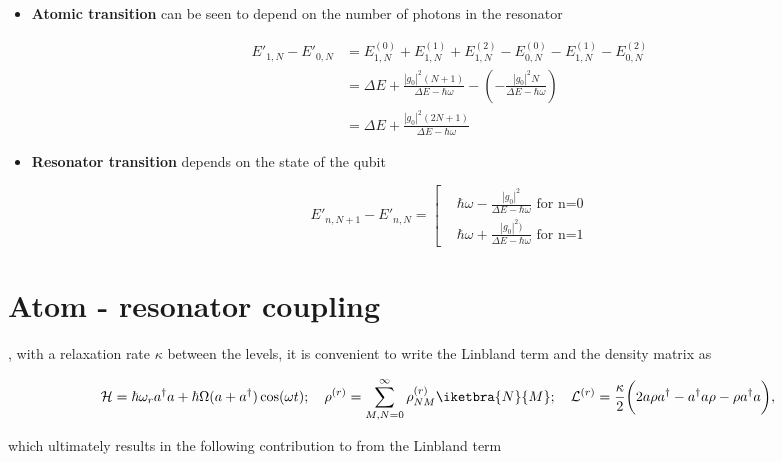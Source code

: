 \begin{itemize}
\item \textbf{Atomic transition} can be  seen to depend on the number
  of photons in the resonator

  \begin{equation}\label{secAtom}\begin{aligned}
      E'_{1,N}-E'_{0,N}   &  =   E_{1,N}^{(0)}   +  E_{1,N}^{(1)}   +
      E_{1,N}^{(2)} -  E_{0,N}^{(0)} - E_{1,N}^{(1)}  - E_{0,N}^{(2)}
      \\& = \Delta E +  \frac{|g_0|^2(N+1)}{\Delta E - \hbar\omega} -
      (-\frac{|g_0|^2N}{\Delta   E  -   \hbar\omega})\\&  =   {\Delta
        E+\frac{|g_0|^2(2N+1)}{\Delta E - \hbar\omega}}
    \end{aligned}
  \end{equation}
\item \textbf{Resonator transition} depends on the state of the qubit

  \begin{equation}\label{secRes}
    E'_{n,N+1}-E'_{n,N} = \left[\begin{aligned}
        & \hbar\omega  -\frac{|g_0|^2}{\Delta E -  \hbar\omega} \text{ for n=0}
        \\&  \hbar\omega + {\frac{|g_0|^2)}{\Delta E -  \hbar\omega}}\text{ for n=1}
      \end{aligned}\right.
  \end{equation}
\end{itemize}

\newpage

\section{Atom - resonator coupling}
\noindent  {}, with a relaxation rate $ \kappa $ between the levels, it
is convenient to write the Linbland term and the density matrix as

\begin{equation}\label{ar2}
  \mathcal{H} = \hbar\omega_ra^{\dagger}a+\hbar\Omega(a+a^{\dagger})\cos(\omega t);\quad\rho^{(r)} = \sum_{M,N=0}^{\infty}\rho_{NM}^{(r)}\iketbra{N}{M};\quad \mathcal{L}^{(r)} = \frac{\kappa}{2}\bigg(2a\rho a^{\dagger}-a^{\dagger}a\rho-\rho a^{\dagger}a\bigg),
\end{equation}

\noindent which  ultimately results in the  following contribution to
from the Linbland term

